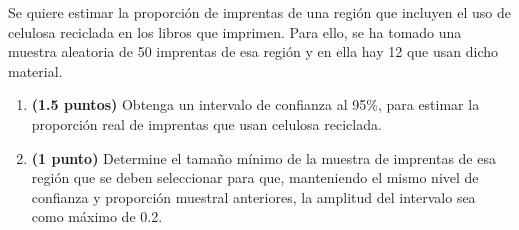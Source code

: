 
Se quiere estimar la proporción de imprentas de una región que incluyen
el uso de celulosa reciclada en los libros que imprimen. Para ello, se ha
tomado una muestra aleatoria de 50 imprentas de esa región y en ella hay
12 que usan dicho material.
\begin{enumerate}[label=\alph*)]
  \item \textbf{(1.5 puntos)} Obtenga un intervalo de confianza al 95\%,
  para estimar la proporción real de imprentas que usan celulosa reciclada.
  \item \textbf{(1 punto)} Determine el tamaño mínimo de la muestra de
  imprentas de esa región que se deben seleccionar para que, manteniendo
  el mismo nivel de confianza y proporción muestral anteriores, la amplitud
  del intervalo sea como máximo de 0.2.
\end{enumerate}
